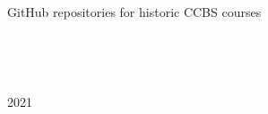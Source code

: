 \documentclass[
  letterpaper,
]{book}
\begin{document}
\begin{figure}
\begin{minipage}[t]{0.10\linewidth}
{\centering 

~

}

\end{minipage}%
%
\begin{minipage}[t]{0.40\linewidth}

{\centering 


\caption{2021}

}

\end{minipage}%
%
\begin{minipage}[t]{0.05\linewidth}

{\centering 

~

}

\end{minipage}%
\newline
\begin{minipage}[t]{0.05\linewidth}

{\centering 

~

}

\end{minipage}%
%
\begin{minipage}[t]{0.40\linewidth}

{\centering 

GitHub repositories for historic CCBS courses

}

\end{minipage}%
%
\begin{minipage}[t]{0.10\linewidth}

{\centering 

~

}

\end{minipage}%
%
\begin{minipage}[t]{0.05\linewidth}

{\centering 

~

}

\end{minipage}%

\end{figure}
\end{document}
